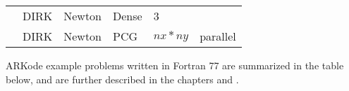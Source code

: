 \documentclass[letterpaper,10pt,english]{sphinxmanual}
\begin{document}
\begin{savenotes}\sphinxattablestart
\centering
\begin{tabulary}{\linewidth}[t]{|T|T|T|T|T|T|}
\hline
{}\relax &\relax &\relax &\relax &\relax &\relax \\
\hline
{\hyperref[\detokenize{cpp_serial:ark-analytic-sys}]{}}
&
DIRK
&
Newton
&
Dense
&
3
&\\
\hline
{\hyperref[\detokenize{cpp_parallel:ark-heat2d}]{}}
&
DIRK
&
Newton
&
PCG
&
\(nx*ny\)
&
parallel
\\
\hline
\end{tabulary}
\par
\sphinxattableend\end{savenotes}

ARKode example problems written in Fortran 77 are summarized in the table
below, and are further described in the chapters {\hyperref[\detokenize{f77_serial:serial-f77}]{}} and
{\hyperref[\detokenize{f77_parallel:parallel-f77}]{}}.
\end{document}
